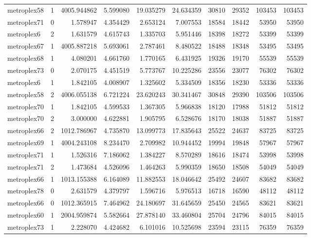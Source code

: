 \begin{longtable}{|l|r|r|r|r|r|r|r|r|r|}
metroplex58 & 1 & 4005.944862 & 5.599080 & 19.035279 & 24.634359 & 30810 & 29352 & 103453 & 103453 \\
metroplex71 & 0 & 1.578947 & 4.354429 & 2.653124 & 7.007553 & 18584 & 18442 & 53950 & 53950 \\
metroplex6 & 2 & 1.631579 & 4.615743 & 1.335703 & 5.951446 & 18398 & 18272 & 53399 & 53399 \\
metroplex67 & 1 & 4005.887218 & 5.693061 & 2.787461 & 8.480522 & 18488 & 18348 & 53495 & 53495 \\
metroplex68 & 1 & 4.080201 & 4.661760 & 1.770165 & 6.431925 & 19326 & 19170 & 55539 & 55539 \\
metroplex73 & 0 & 2.070175 & 4.451519 & 5.773767 & 10.225286 & 23556 & 23077 & 76302 & 76302 \\
metroplex6 & 1 & 1.842105 & 4.008907 & 1.325602 & 5.334509 & 18356 & 18230 & 53336 & 53336 \\
metroplex58 & 2 & 4006.055138 & 6.721224 & 23.620243 & 30.341467 & 30848 & 29390 & 103506 & 103506 \\
metroplex70 & 1 & 1.842105 & 4.599533 & 1.367305 & 5.966838 & 18120 & 17988 & 51812 & 51812 \\
metroplex70 & 2 & 3.000000 & 4.622881 & 1.905795 & 6.528676 & 18170 & 18038 & 51887 & 51887 \\
metroplex66 & 2 & 1012.786967 & 4.735870 & 13.099773 & 17.835643 & 25522 & 24637 & 83725 & 83725 \\
metroplex69 & 1 & 4004.243108 & 8.234470 & 2.709982 & 10.944452 & 19994 & 19848 & 57967 & 57967 \\
metroplex71 & 1 & 1.526316 & 7.186062 & 1.384227 & 8.570289 & 18616 & 18474 & 53998 & 53998 \\
metroplex71 & 2 & 1.473684 & 4.526096 & 1.464263 & 5.990359 & 18650 & 18508 & 54049 & 54049 \\
metroplex66 & 1 & 1013.155388 & 6.164089 & 11.882553 & 18.046642 & 25492 & 24607 & 83682 & 83682 \\
metroplex78 & 0 & 2.631579 & 4.379797 & 1.596716 & 5.976513 & 16718 & 16590 & 48112 & 48112 \\
metroplex66 & 0 & 1012.365915 & 7.464962 & 24.180697 & 31.645659 & 25450 & 24565 & 83621 & 83621 \\
metroplex60 & 1 & 2004.959874 & 5.582664 & 27.878140 & 33.460804 & 25704 & 24796 & 84015 & 84015 \\
metroplex73 & 1 & 2.228070 & 4.424682 & 6.101016 & 10.525698 & 23594 & 23115 & 76359 & 76359 \\

\end{longtable}
